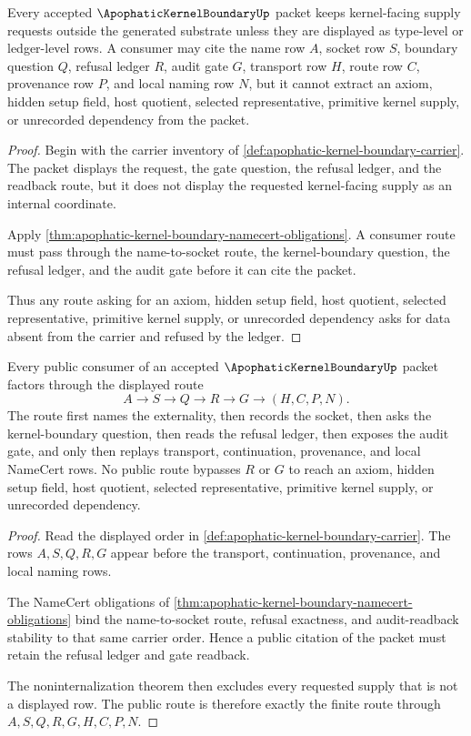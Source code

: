 \begin{theorem}
\label{thm:apophatic-kernel-boundary-noninternalization}
Every accepted $\ApophaticKernelBoundaryUp$ packet keeps kernel-facing supply requests outside the generated substrate unless they are displayed as type-level or ledger-level rows. A consumer may cite the name row $A$, socket row $S$, boundary question $Q$, refusal ledger $R$, audit gate $G$, transport row $H$, route row $C$, provenance row $P$, and local naming row $N$, but it cannot extract an axiom, hidden setup field, host quotient, selected representative, primitive kernel supply, or unrecorded dependency from the packet.
\end{theorem}
\begin{proof}
Begin with the carrier inventory of \autoref{def:apophatic-kernel-boundary-carrier}. The packet displays the request, the gate question, the refusal ledger, and the readback route, but it does not display the requested kernel-facing supply as an internal coordinate.

Apply \autoref{thm:apophatic-kernel-boundary-namecert-obligations}. A consumer route must pass through the name-to-socket route, the kernel-boundary question, the refusal ledger, and the audit gate before it can cite the packet.

Thus any route asking for an axiom, hidden setup field, host quotient, selected representative, primitive kernel supply, or unrecorded dependency asks for data absent from the carrier and refused by the ledger.
\end{proof}

\begin{theorem}
\label{thm:apophatic-kernel-boundary-public-route}
Every public consumer of an accepted $\ApophaticKernelBoundaryUp$ packet factors through the displayed route
$$
A \to S \to Q \to R \to G \to (H,C,P,N).
$$
The route first names the externality, then records the socket, then asks the kernel-boundary question, then reads the refusal ledger, then exposes the audit gate, and only then replays transport, continuation, provenance, and local NameCert rows. No public route bypasses $R$ or $G$ to reach an axiom, hidden setup field, host quotient, selected representative, primitive kernel supply, or unrecorded dependency.
\end{theorem}
\begin{proof}
Read the displayed order in \autoref{def:apophatic-kernel-boundary-carrier}. The rows $A,S,Q,R,G$ appear before the transport, continuation, provenance, and local naming rows.

The NameCert obligations of \autoref{thm:apophatic-kernel-boundary-namecert-obligations} bind the name-to-socket route, refusal exactness, and audit-readback stability to that same carrier order. Hence a public citation of the packet must retain the refusal ledger and gate readback.

The noninternalization theorem then excludes every requested supply that is not a displayed row. The public route is therefore exactly the finite route through $A,S,Q,R,G,H,C,P,N$.
\end{proof}


